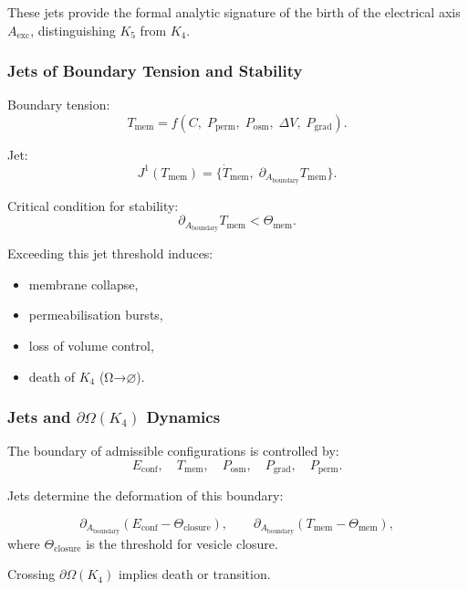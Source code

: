 These jets provide the formal analytic signature of the birth of the
electrical axis $A_{\mathrm{exc}}$, distinguishing $K_5$ from $K_4$.


\subsubsection{Jets of Boundary Tension and Stability}

Boundary tension:
\[
T_{\mathrm{mem}}=f(C,\; P_{\mathrm{perm}},\; P_{\mathrm{osm}},\; \Delta V,\; P_{\mathrm{grad}}).
\]

Jet:
\[
J^1(T_{\mathrm{mem}})=
\{\dot{T}_{\mathrm{mem}},\;\partial_{A_{\mathrm{boundary}}}T_{\mathrm{mem}}\}.
\]

Critical condition for stability:
\[
\partial_{A_{\mathrm{boundary}}}T_{\mathrm{mem}} < \Theta_{\mathrm{mem}}.
\]

Exceeding this jet threshold induces:

\begin{itemize}
    \item membrane collapse,
    \item permeabilisation bursts,
    \item loss of volume control,
    \item death of $K_4$ (Ω→$\varnothing$).
\end{itemize}


\subsubsection{Jets and \texorpdfstring{$\partial\Omega(K_4)$}{\partial\Omega(K_4)} Dynamics}

The boundary of admissible configurations is controlled by:
\[
E_{\mathrm{conf}},\quad
T_{\mathrm{mem}},\quad
P_{\mathrm{osm}},\quad
P_{\mathrm{grad}},\quad
P_{\mathrm{perm}}.
\]

Jets determine the deformation of this boundary:

\[
\partial_{A_{\mathrm{boundary}}}
(E_{\mathrm{conf}} - \Theta_{\mathrm{closure}}),
\qquad
\partial_{A_{\mathrm{boundary}}}
(T_{\mathrm{mem}} - \Theta_{\mathrm{mem}}),
\]
where $\Theta_{\mathrm{closure}}$ is the threshold for vesicle closure.

Crossing $\partial\Omega(K_4)$ implies death or transition.


